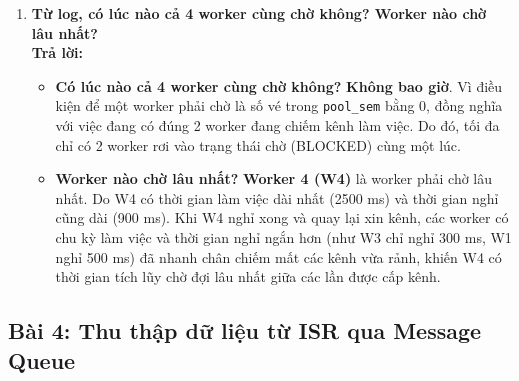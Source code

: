 \begin{enumerate}[label=(\alph*)]
    \item \textbf{Từ log, có lúc nào cả 4 worker cùng chờ không? Worker nào chờ lâu nhất?} \\
    \textbf{Trả lời:}
    \begin{itemize}
        \item \textbf{Có lúc nào cả 4 worker cùng chờ không?} \textbf{Không bao giờ}. Vì điều kiện để một worker phải chờ là số vé trong \texttt{pool\_sem} bằng 0, đồng nghĩa với việc đang có đúng 2 worker đang chiếm kênh làm việc. Do đó, tối đa chỉ có 2 worker rơi vào trạng thái chờ (BLOCKED) cùng một lúc.
        \item \textbf{Worker nào chờ lâu nhất?} \textbf{Worker 4 (W4)} là worker phải chờ lâu nhất. Do W4 có thời gian làm việc dài nhất (2500 ms) và thời gian nghỉ cũng dài (900 ms). Khi W4 nghỉ xong và quay lại xin kênh, các worker có chu kỳ làm việc và thời gian nghỉ ngắn hơn (như W3 chỉ nghỉ 300 ms, W1 nghỉ 500 ms) đã nhanh chân chiếm mất các kênh vừa rảnh, khiến W4 có thời gian tích lũy chờ đợi lâu nhất giữa các lần được cấp kênh.
    \end{itemize}
\end{enumerate}

\newpage
\subsection{Bài 4: Thu thập dữ liệu từ ISR qua Message Queue}

